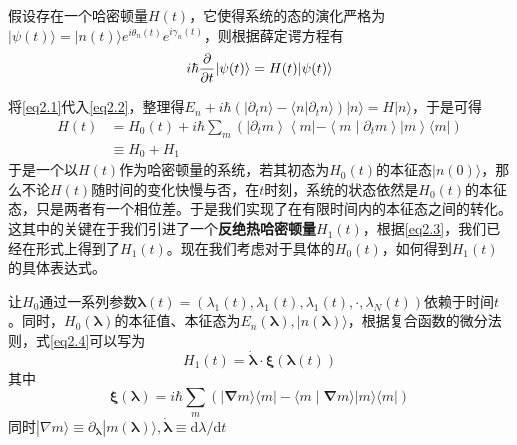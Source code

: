 假设存在一个哈密顿量$H(t)$，它使得系统的态的演化严格为$|\psi(t)\rangle=|n(t)\rangle e^{i \theta_{n}(t)} e^{i \gamma_{n}(t)}$，则根据薛定谔方程有
\begin{equation}
    i \hbar \frac{\partial }{\partial t} |\psi(t)\rangle= H(t) |\psi(t)\rangle
    \label{eq2.2}
\end{equation}

将\eqref{eq2.1}代入\eqref{eq2.2}，整理得$ E_{n}+ i \hbar \left( | \partial_{t} n \rangle -\langle n | \partial_t n \rangle\right)|n\rangle=H| n\rangle$，于是可得
\begin{equation}
    \begin{split}
        H(t)&=H_{0}(t)+i \hbar \sum_{m}\left(\left|\partial_{t} m\right\rangle\left\langle m\left|-\left\langle m \mid \partial_{t} m\right\rangle\right| m\right\rangle\langle m|\right) \\
        &\equiv H_0 + H_1
    \end{split}
    \label{eq2.3}
\end{equation}
于是一个以$H (t)$作为哈密顿量的系统，若其初态为$H_0 (t)$的本征态$| n(0) \rangle$，那么不论$H (t)$随时间的变化快慢与否，在$t$时刻，系统的状态依然是$H_0 (t)$的本征态，只是两者有一个相位差。于是我们实现了在有限时间内的本征态之间的转化。这其中的关键在于我们引进了一个\textbf{反绝热哈密顿量}$H_1 (t)$，根据\eqref{eq2.3}，我们已经在形式上得到了$H_1 (t)$。现在我们考虑对于具体的$H_0 (t)$，如何得到$H_1 (t)$的具体表达式。\cite{Jarzynski2013}

让$H_0$通过一系列参数$\bm{\lambda}(t)=\left( \lambda_1 (t) , \lambda_1 (t) , \lambda_1 (t) , \cdot , \lambda_{N} (t) \right)$依赖于时间$t$。同时，$H_0 (\bm{\lambda})$的本征值、本征态为$E_n (\bm{\lambda}), | n (\bm{\lambda}) \rangle$，根据复合函数的微分法则，式\eqref{eq2.4}可以写为
\begin{equation}
    H_1 (t)=\dot{\boldsymbol{\lambda}} \cdot \boldsymbol{\xi}(\boldsymbol{\lambda}(t))
    \label{eq2.5}
\end{equation}
其中
\begin{equation}
    \boldsymbol{\xi}(\boldsymbol{\lambda})=i \hbar \sum_{m}(|\boldsymbol{\nabla} m\rangle\langle m|-\langle m \mid \boldsymbol{\nabla} m\rangle| m\rangle\langle m|)
    \label{eq2.4}
\end{equation}
同时$|\nabla m\rangle \equiv \partial_{\boldsymbol{\lambda}}|m(\boldsymbol{\lambda})\rangle  , \dot{\boldsymbol{\lambda}} \equiv \mathrm{d} \lambda / \mathrm{d} t$

